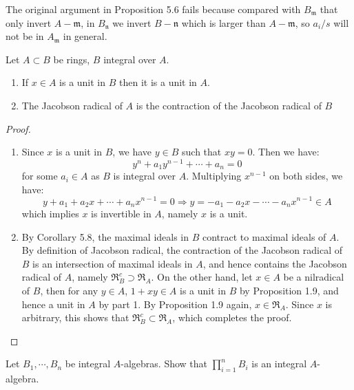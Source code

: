 \documentclass{solution}
\begin{document}
{\color{red} The original argument in Proposition 5.6 fails because compared with $B_{\mathfrak{m}}$ that only invert $A - \mathfrak{m}$, in $B_{\mathfrak{n}}$ we invert $B - \mathfrak{n}$ which is larger than $A - \mathfrak{m}$, so $a_i / s$ will not be in $A_{\mathfrak{m}}$ in general.}

\begin{problem}
    Let $A \subset B$ be rings, $B$ integral over $A$.
    \begin{enumerate}
        \item If $x \in A$ is a unit in $B$ then it is a unit in $A$.
        \item The Jacobson radical of $A$ is the contraction of the Jacobson radical of $B$
    \end{enumerate}
\end{problem}

\begin{proof}
    \begin{enumerate}
        \item Since $x$ is a unit in $B$, we have $y \in B$ such that $xy = 0$. Then we have:
        $$y^n + a_1 y^{n - 1} + \cdots + a_n = 0$$
        for some $a_i \in A$ as $B$ is integral over $A$. Multiplying $x^{n - 1}$ on both sides, we have:
        $$y + a_1 + a_2x + \cdots + a_nx^{n - 1} = 0 \Rightarrow y = -a_1 - a_2x - \cdots - a_nx^{n - 1} \in A$$
        which implies $x$ is invertible in $A$, namely $x$ is a unit.
        \item By Corollary 5.8, the maximal ideals in $B$ contract to maximal ideals of $A$. By definition of Jacobson radical, the contraction of the Jacobson radical of $B$ is an intersection of maximal ideals in $A$, and hence contains the Jacobson radical of $A$, namely $\mathfrak{R}_B^c \supset \mathfrak{R}_A$. On the other hand, let $x \in A$ be a nilradical of $B$, then for any $y \in A$, $1 + xy \in A$ is a unit in $B$ by Proposition 1.9, and hence a unit in $A$ by part 1. By Proposition 1.9 again, $x \in \mathfrak{R}_A$. Since $x$ is arbitrary, this shows that $\mathfrak{R}_B^c \subset \mathfrak{R}_A$, which completes the proof.
    \end{enumerate}
\end{proof}

\begin{problem}
    Let $B_1, \cdots, B_n$ be integral $A$-algebras. Show that $\prod\limits_{i = 1}^{n} B_i$ is an integral $A$-algebra.
\end{problem}
\end{document}
